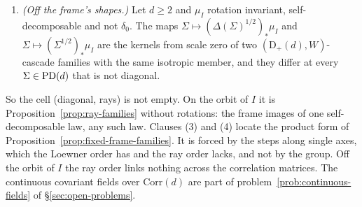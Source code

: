 \begin{proposition}
\begin{enumerate}
the $(\mathrm D_+(d), W)$-family of (2) with $\mu_I = N(0,\Theta)$ is the restriction of no
$(\mathrm D_+(d), \text{Loewner})$-family.
\item \emph{(Off the frame's shapes.)} Let $d \ge 2$ and $\mu_I$ rotation invariant, self-decomposable and
not $\delta_0$. The maps $\Sigma \mapsto (\Delta(\Sigma)^{1/2})_*\mu_I$ and
$\Sigma \mapsto (\Sigma^{1/2})_*\mu_I$ are the kernels from scale zero of two
$(\mathrm D_+(d), W)$-cascade families with the same isotropic member, and they differ at every
$\Sigma \in \mathrm{PD}(d)$ that is not diagonal.
\end{enumerate}
\end{proposition}

So the cell (diagonal, rays) is not empty. On the orbit of $I$ it is Proposition~\ref{prop:ray-families}
without rotations: the frame images of one self-decomposable law, any such law. Clauses (3) and (4)
locate the product form of Proposition~\ref{prop:fixed-frame-families}. It is forced by the steps along
single axes, which the Loewner order has and the ray order lacks, and not by the group. Off the orbit of
$I$ the ray order links nothing across the correlation matrices. The continuous covariant fields
over $\mathrm{Corr}(d)$ are part of problem~\ref{prob:continuous-fields} of \S\ref{sec:open-problems}.

